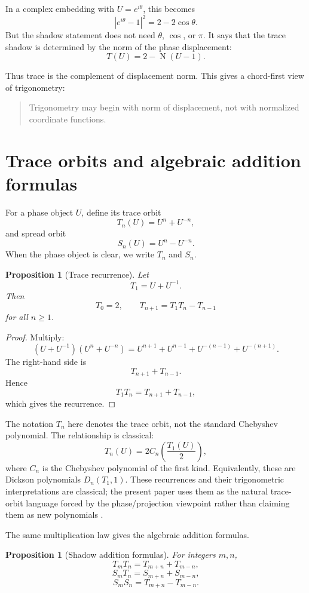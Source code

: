 \documentclass[11pt]{article}
\newtheorem{proposition}[definition]{Proposition}
\newcommand{\Nm}{\operatorname{N}}
\begin{document}
In a complex embedding with $U=e^{i\theta}$, this becomes
\[
    |e^{i\theta}-1|^2=2-2\cos\theta.
\]
But the shadow statement does not need $\theta$, $\cos$, or $\pi$.  It says that the trace shadow is determined by the norm of the phase displacement:
\[
    T(U)=2-\Nm(U-1).
\]

Thus trace is the complement of displacement norm.  This gives a chord-first view of trigonometry:
\begin{quote}
Trigonometry may begin with norm of displacement, not with normalized coordinate functions.
\end{quote}

\section{Trace orbits and algebraic addition formulas}

For a phase object $U$, define its trace orbit
\[
    T_n(U)=U^n+U^{-n},
\]
and spread orbit
\[
    S_n(U)=U^n-U^{-n}.
\]
When the phase object is clear, we write $T_n$ and $S_n$.

\begin{proposition}[Trace recurrence]\label{prop:trace-recurrence}
Let
\[
    T_1=U+U^{-1}.
\]
Then
\[
    T_0=2,
    \qquad
    T_{n+1}=T_1T_n-T_{n-1}
\]
for all $n\ge1$.
\end{proposition}

\begin{proof}
Multiply:
\[
    (U+U^{-1})(U^n+U^{-n})
    =U^{n+1}+U^{n-1}+U^{-(n-1)}+U^{-(n+1)}.
\]
The right-hand side is
\[
    T_{n+1}+T_{n-1}.
\]
Hence
\[
    T_1T_n=T_{n+1}+T_{n-1},
\]
which gives the recurrence.
\end{proof}

The notation $T_n$ here denotes the trace orbit, not the standard Chebyshev polynomial.  The relationship is classical:
\[
    T_n(U)=2C_n\!\left(\frac{T_1(U)}2\right),
\]
where $C_n$ is the Chebyshev polynomial of the first kind.  Equivalently, these are Dickson polynomials $D_n(T_1,1)$.  These recurrences and their trigonometric interpretations are classical; the present paper uses them as the natural trace-orbit language forced by the phase/projection viewpoint rather than claiming them as new polynomials \cite{Rivlin1990,ConwayJones1976}.

The same multiplication law gives the algebraic addition formulas.

\begin{proposition}[Shadow addition formulas]\label{prop:addition-formulas}
For integers $m,n$,
\[
    T_mT_n=T_{m+n}+T_{m-n},
\]
\[
    S_mT_n=S_{m+n}+S_{m-n},
\]
\[
    S_mS_n=T_{m+n}-T_{m-n}.
\]
\end{proposition}
\end{document}
